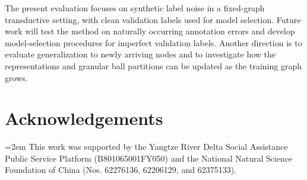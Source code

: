 \documentclass[times,review,10pt]{elsarticle}
\theoremstyle{definition}
\theoremstyle{plain}
\begin{document}
The present evaluation focuses on synthetic label noise in a fixed-graph transductive setting, with clean validation labels used for model selection. Future work will test the method on naturally occurring annotation errors and develop model-selection procedures for imperfect validation labels. Another direction is to evaluate generalization to newly arriving nodes and to investigate how the representations and granular ball partitions can be updated as the training graph grows.
\section*{Acknowledgements}

\begingroup
\emergencystretch=2em
This work was supported by the Yangtze River Delta Social Assistance Public Service Platform (B801065001FY050)
and the National Natural Science Foundation of China (Nos. 62276136, 62206129, and 62375133).\par
\endgroup

\setlength{\bibsep}{0.5pt plus 0.2pt minus 0.2pt}



\end{document}
